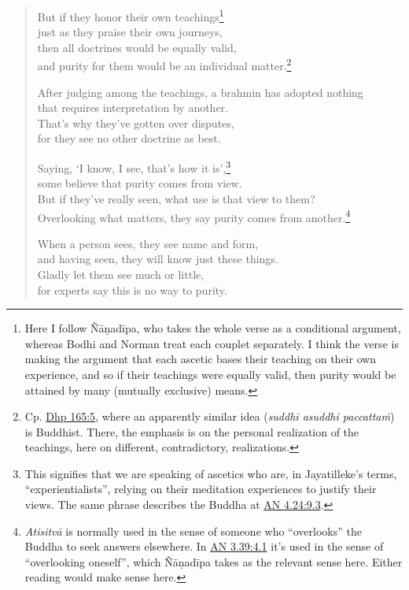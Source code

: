 \documentclass[12pt,openany]{book}%
\begin{document}
\begin{verse}
But if they honor their own teachings\footnote{Here I follow \textsanskrit{Ñāṇadīpa}, who takes the whole verse as a conditional argument, whereas Bodhi and Norman treat each couplet separately. I think the verse is making the argument that each ascetic bases their teaching on their own experience, and so if their teachings were equally valid, then purity would be attained by many (mutually exclusive) means. } \\
just as they praise their own journeys, \\
then all doctrines would be equally valid, \\
and purity for them would be an individual matter.\footnote{Cp. \href{https://suttacentral.net/dhp165/en/sujato\#5}{Dhp 165:5}, where an apparently similar idea (\textit{\textsanskrit{suddhī} asuddhi \textsanskrit{paccattaṁ}}) is Buddhist. There, the emphasis is on the personal realization of the teachings, here on different, contradictory, realizations. } 

After judging among the teachings, a brahmin has adopted nothing \\
that requires interpretation by another. \\
That’s why they’ve gotten over disputes, \\
for they see no other doctrine as best. 

Saying, ‘I know, I see, that’s how it is’,\footnote{This signifies that we are speaking of ascetics who are, in Jayatilleke’s terms, “experientialists”, relying on their meditation experiences to justify their views. The same phrase describes the Buddha at \href{https://suttacentral.net/an4.24/en/sujato\#9.3}{AN 4.24:9.3}. } \\
some believe that purity comes from view. \\
But if they’ve really seen, what use is that view to them? \\
Overlooking what matters, they say purity comes from another.\footnote{\textit{\textsanskrit{Atisitvā}} is normally used in the sense of someone who “overlooks” the Buddha to seek answers elsewhere. In \href{https://suttacentral.net/an3.39/en/sujato\#4.1}{AN 3.39:4.1} it’s used in the sense of “overlooking oneself”, which \textsanskrit{Ñāṇadīpa} takes as the relevant sense here. Either reading would make sense here. } 

When a person sees, they see name and form, \\
and having seen, they will know just these things. \\
Gladly let them see much or little, \\
for experts say this is no way to purity. 


\end{verse}
\end{document}
